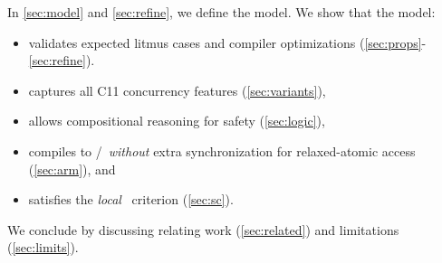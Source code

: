 In \textsection\ref{sec:model} and \textsection\ref{sec:refine}, we define the model.  We show that the model:
\begin{itemize}
\item validates expected litmus cases and compiler optimizations
  (\textsection\ref{sec:props}-\ref{sec:refine}).

\item captures all C11 concurrency features  %
  (\textsection\ref{sec:variants}),

\item allows compositional reasoning for safety %
  (\textsection\ref{sec:logic}),

\item compiles to \armeight/\tso\ {\em without} extra synchronization for
  relaxed-atomic access (\textsection\ref{sec:arm}), and

\item  satisfies the \emph{local} \drfsc\ criterion \cite{Dolan:2018:BDR:3192366.3192421} (\textsection\ref{sec:sc}).

\end{itemize}
We conclude by discussing relating work (\textsection\ref{sec:related}) and limitations (\textsection\ref{sec:limits}).







